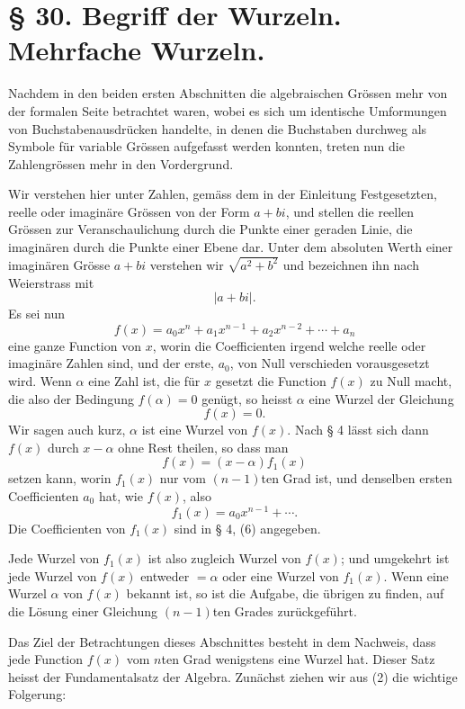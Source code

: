\documentclass[11pt]{article}
\begin{document}
\section*{§ 30. Begriff der Wurzeln. Mehrfache Wurzeln.}

Nachdem in den beiden ersten Abschnitten die algebraischen Grössen mehr von der formalen Seite betrachtet waren, wobei es sich um identische Umformungen von Buchstabenausdrücken handelte, in denen die Buchstaben durchweg als Symbole für variable Grössen aufgefasst werden konnten, treten nun die Zahlengrössen mehr in den Vordergrund.

Wir verstehen hier unter Zahlen, gemäss dem in der Einleitung Festgesetzten, reelle oder imaginäre Grössen von der Form $a+bi$, und stellen die reellen Grössen zur Veranschaulichung durch die Punkte einer geraden Linie, die imaginären durch die Punkte einer Ebene dar. Unter dem absoluten Werth einer imaginären Grösse $a+bi$ verstehen wir $\sqrt{a^2+b^2}$ und bezeichnen ihn nach Weierstrass mit
\[
 |a+bi|.
\]
Es sei nun
\begin{equation}
 f(x)=a_0x^n+a_1x^{n-1}+a_2x^{n-2}+\cdots+a_n
\tag{1}
\end{equation}
eine ganze Function von $x$, worin die Coefficienten irgend welche reelle oder imaginäre Zahlen sind, und der erste, $a_0$, von Null verschieden vorausgesetzt wird. Wenn $\alpha$ eine Zahl ist, die für $x$ gesetzt die Function $f(x)$ zu Null macht, die also der Bedingung $f(\alpha)=0$ genügt, so heisst $\alpha$ eine Wurzel der Gleichung
\[
 f(x)=0.
\]
Wir sagen auch kurz, $\alpha$ ist eine Wurzel von $f(x)$. Nach § 4 lässt sich dann $f(x)$ durch $x-\alpha$ ohne Rest theilen, so dass man
\begin{equation}
 f(x)=(x-\alpha)f_1(x)
\tag{2}
\end{equation}
setzen kann, worin $f_1(x)$ nur vom $(n-1)$ten Grad ist, und denselben ersten Coefficienten $a_0$ hat, wie $f(x)$, also
\[
 f_1(x)=a_0x^{n-1}+\cdots .
\]
Die Coefficienten von $f_1(x)$ sind in § 4, (6) angegeben.

Jede Wurzel von $f_1(x)$ ist also zugleich Wurzel von $f(x)$; und umgekehrt ist jede Wurzel von $f(x)$ entweder $=\alpha$ oder eine Wurzel von $f_1(x)$. Wenn eine Wurzel $\alpha$ von $f(x)$ bekannt ist, so ist die Aufgabe, die übrigen zu finden, auf die Lösung einer Gleichung $(n-1)$ten Grades zurückgeführt.

Das Ziel der Betrachtungen dieses Abschnittes besteht in dem Nachweis, dass jede Function $f(x)$ vom $n$ten Grad wenigstens eine Wurzel hat. Dieser Satz heisst der Fundamentalsatz der Algebra. Zunächst ziehen wir aus (2) die wichtige Folgerung:
\end{document}
